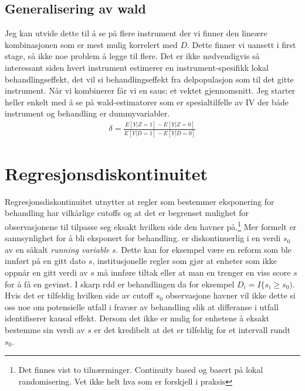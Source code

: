 \subsection{Generalisering av wald}
Jeg kan utvide dette til å se på flere instrument der vi finner den lineære kombinasjonen som er mest mulig korrelert med $D$. Dette finner vi uansett i first stage, så ikke noe problem å legge til flere. Det er ikke nødvendigvis så interessant siden hvert instrument estimerer en instrument-spesifikk lokal behandlingseffekt, det vil si behandlingseffekt fra delpopulasjon som  til det gitte instrument. Når vi kombinerer får vi en saus; et vektet gjennomsnitt. Jeg starter heller enkelt med å se på wald-estimatorer som er spesialtilfelle av IV der både instrument og behandling er dummyvariabler.
\begin{align}
\delta = \frac{E[Y|Z=1]-E[Y|Z=0]}{E[Y|D=1]-E[Y|D=0]}
\end{align}
\section{Regresjonsdiskontinuitet}
Regresjonsdiskontinuitet utnytter at regler som bestemmer eksponering for behandling har vilkårlige cutoffs og at det er begrenset mulighet for observasjonene til  tilpasse seg eksakt hvilken side den havner på.\footnote{Det finnes vist to tilnærminger. Continuity based og basert på lokal randomisering. Vet ikke helt hva som er forskjell i praksis} Mer formelt er sannsynlighet for å bli eksponert for behandling. er diskontinuerlig i en verdi $s_0$ av en såkalt \textit{running variable} $s$. Dette kan for eksempel være en reform som ble innført på en gitt dato $s$, institusjonelle regler som gjør at enheter som ikke oppnår en gitt verdi av $s$ må innføre tiltak eller at man en trenger en viss score $s$ for å få en gevinst. I skarp rdd er behandlingen da for eksempel $D_i = I\{s_i \geqslant s_0)$. Hvis det er tilfeldig hvilken side av cutoff $s_0$ observasjone havner vil ikke dette si oss noe om potensielle utfall i fravær av behandling slik at differanse i utfall identifiserer kausal effekt. Dersom det ikke er mulig for enhetene å eksakt bestemme sin verdi av $s$ er det kredibelt at det er tilfeldig for et intervall rundt $s_0$.

